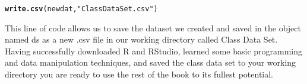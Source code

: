 \documentclass[11pt,openany]{book}\usepackage[]{graphicx}\usepackage[]{color}
\makeatletter
\newcommand{\hlstr}[1]{\textcolor[rgb]{0.192,0.494,0.8}{#1}}%
\newcommand{\hlstd}[1]{\textcolor[rgb]{0.345,0.345,0.345}{#1}}%
\newcommand{\hlkwd}[1]{\textcolor[rgb]{0.737,0.353,0.396}{\textbf{#1}}}%
\newenvironment{kframe}{%
 \def\at@end@of@kframe{}%
 \ifinner\ifhmode%
  \def\at@end@of@kframe{\end{minipage}}%
  \begin{minipage}{\columnwidth}%
 \fi\fi%
 \def\FrameCommand##1{\hskip\@totalleftmargin \hskip-\fboxsep
 \colorbox{shadecolor}{##1}\hskip-\fboxsep
     \hskip-\linewidth \hskip-\@totalleftmargin \hskip\columnwidth}%
 \MakeFramed {\advance\hsize-\width
   \@totalleftmargin\z@ \linewidth\hsize
   \@setminipage}}%
 {\par\unskip\endMakeFramed%
 \at@end@of@kframe}
\newenvironment{knitrout}{}{} %
\renewenvironment{knitrout}{\begin{singlespace}}{\end{singlespace}} %
\makeatother
\begin{document}
\begin{knitrout}
\color{fgcolor}\begin{kframe}
\begin{alltt}
\hlkwd{write.csv}\hlstd{(newdat,} \hlstr{"Class Data Set.csv"}\hlstd{)}
\end{alltt}
\end{kframe}
\end{knitrout}

This line of code allows us to save the dataset we created and saved in the object named ds as a new .csv file in our working directory called Class Data Set. Having successfully downloaded R and RStudio, learned some basic programming and data manipulation techniques, and saved the class data set to your working directory you are ready to use the rest of the book to its fullest potential.  


\end{document}
